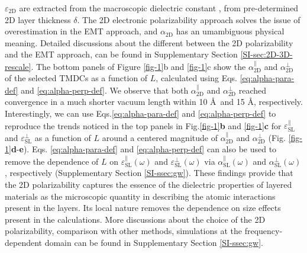 \documentclass[journal=ancac3,manuscript=article,email=true,hyperref=true,keywords=false]{achemso}
\begin{document}
$\varepsilon_{\mathrm{2D}}$ are extracted from the macroscopic
dielectric constant \cite{Matthes_2016,Laturia_2018}, from
pre-determined 2D layer thickness $\delta$. The 2D electronic
polarizability approach solves the issue of overestimation in the EMT
approach, and $\alpha_{\mathrm{2D}}$ has an umambiguous physical
meaning. Detailed discussions about the different between the 2D
polarizability and the EMT approach, can be found in Supplementary
Section \ref{SI-sec:2D-3D-rescale}.
%
%
The bottom panels of Figure \ref{fig-1}b and \ref{fig-1}c show the
$\alpha_{\mathrm{2D}}^{\parallel}$ and $\alpha_{\mathrm{2D}}^{\perp}$
of the selected TMDCs as a function of $L$, calculated using
Eqs. \ref{eq:alpha-para-def} and \ref{eq:alpha-perp-def}. We observe
that both $\alpha_{\mathrm{2D}}^{\parallel}$ and $\alpha_{\mathrm{2D}}^{\perp}$ reached 
convergence in a much shorter vacuum length within 10 \AA ~and 15 \AA, respectively. 
%
%
Interestingly, we can use Eqs.\ref{eq:alpha-para-def} and
\ref{eq:alpha-perp-def} to reproduce the trends noticed in the top
panels in Fig.\ref{fig-1}{\textbf b} and \ref{fig-1}{\textbf c} for
$\varepsilon_{\mathrm{SL}}^{\parallel}$ and
$\varepsilon_{\mathrm{SL}}^{\perp}$ as a function of $L$ around a
centered magnitude of $\alpha_{\mathrm{2D}}^{\parallel}$ and
$\alpha_{\mathrm{2D}}^{\perp}$
(Fig. \ref{fig-1}\textbf{d}-\textbf{e}).
Eqs. \ref{eq:alpha-para-def} and \ref{eq:alpha-perp-def} can also be used to remove 
the dependence of $L$ on $\varepsilon^{\parallel}_{\mathrm{SL}}(\omega)$ and
$\varepsilon^{\perp}_{\mathrm{SL}}(\omega)$ via $\alpha^{\parallel}_{\mathrm{SL}}(\omega)$ and
$\alpha^{\perp}_{\mathrm{SL}}(\omega)$, respectively (Supplementary Section \ref{SI-ssec:gw}). 
%
% 
% 
% 
% 
These findings provide that the 2D polarizability captures the essence
of the dielectric properties of layered materials as the microscopic
quantity in describing the atomic interactions present in the
layers. Its local nature removes the dependence on size effects
present in the calculations.  More discussions about the choice of the
2D polarizability, comparison with other methods, simulations at the
frequency-dependent domain can be found in Supplementary Section
\ref{SI-ssec:gw}.
\end{document}
